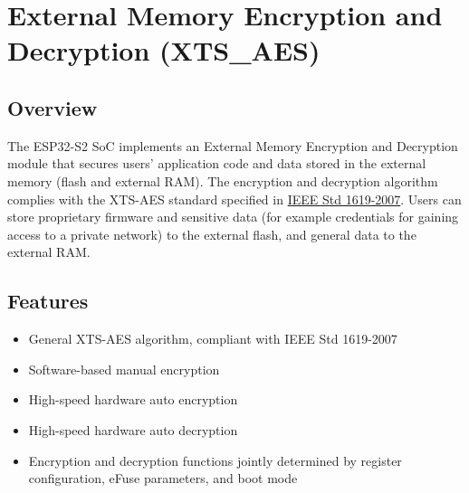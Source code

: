 \documentclass[main\_\_EN.tex]{subfiles}
\begin{document}

\ifglobal
\else
    {\let\clearpage\relax \listoftodos}
    {\let\clearpage\relax \listofdonetodos}
    \tableofcontents
\fi



\chapter{External Memory Encryption and Decryption (XTS\_AES)}
\label{mod:extmemencr}
\hypertarget{extmemencr}{}

\section{Overview}

The ESP32-S2 SoC implements an External Memory Encryption and Decryption module that secures users' application code and data stored in the external memory (flash and external RAM). The encryption and decryption algorithm complies with the XTS-AES standard specified in \href{https://ieeexplore.ieee.org/document/4493450}{IEEE Std 1619-2007}. Users can store proprietary firmware and sensitive data (for example credentials for gaining access to a private network) to the external flash, and general data to the external RAM.

\section{Features}

\begin{itemize}
    \item General XTS-AES algorithm, compliant with IEEE Std 1619-2007
    \item Software-based manual encryption
    \item High-speed hardware auto encryption
    \item High-speed hardware auto decryption
    \item Encryption and decryption functions jointly determined by register configuration, eFuse parameters, and boot mode
\end{itemize}
\end{document}
